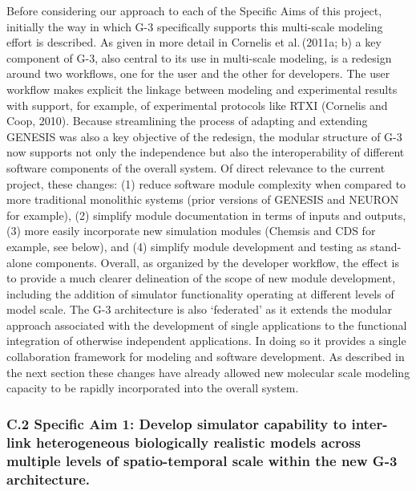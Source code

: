 \documentclass[12pt]{article}
\begin{document}
\noindent Before considering our approach to each of the Specific Aims
of this project, initially the way in which G-3 specifically supports
this multi-scale modeling effort is described.  As given in more detail in Cornelis et al.\,(2011a; b) a key component
of G-3, also central to its use in multi-scale modeling, is a redesign
around two workflows, one for the user and the other for developers.
The user workflow makes explicit the linkage between modeling and
experimental results with support, for example, of experimental
protocols like RTXI (Cornelis and Coop, 2010).  Because streamlining
the process of adapting and extending GENESIS was also a key objective
of the redesign, the modular structure of G-3 now supports not only
the independence but also the interoperability of different software
components of the overall system. Of direct relevance to the current
project, these changes: (1) reduce software module complexity when
compared to more traditional monolithic systems (prior versions of
GENESIS and NEURON for example), (2) simplify module documentation in
terms of inputs and outputs, (3) more easily incorporate new
simulation modules (Chemsis and CDS for example, see below), and (4)
simplify module development and testing as stand-alone components.
Overall, as organized by the developer workflow, the effect is to
provide a much clearer delineation of the scope of new module
development, including the
addition of simulator functionality operating at different levels of
model scale.  The G-3 architecture is also `federated' as it extends
the modular approach associated with the development of single
applications to the functional integration of otherwise independent
applications. In doing so it provides a single collaboration framework
for modeling and software development. As described in the next
section these changes have already allowed new molecular scale
modeling capacity to be rapidly incorporated into the overall
system.\\ %

\subsubsection*{C.2 Specific Aim 1: Develop simulator capability to inter-link heterogeneous biologically realistic models across multiple levels of spatio-temporal scale within the new G-3 architecture.}
\end{document}
